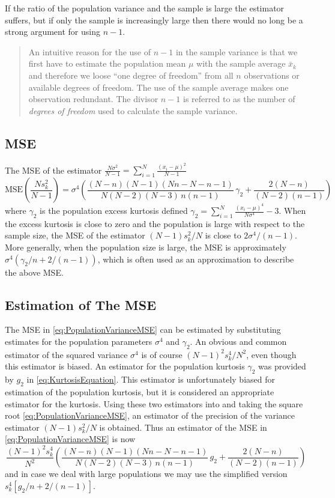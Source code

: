 If the ratio of the population variance and the sample is large the estimator suffers, but if only the sample is increasingly large then there would no long be a strong argument for using $n-1$.
\begin{quote}
    An intuitive reason for the use of $n - 1$ in the sample variance is that we first have to estimate the population mean $\mu$ with the sample average $\bar{x}_k$ and therefore we loose ``one degree of freedom'' from all $n$ 
    observations or available degrees of freedom. The use of the sample average makes one observation redundant.  The divisor $n - 1$ is referred to as the number of \textit{degrees of freedom} used to calculate the sample variance.
\end{quote}

\subsection{MSE}
The MSE of the estimator $\frac{N\sigma^2}{N-1}=\sum_{i=1}^{N}\frac{(x_i-\mu)^2}{N-1}$
\begin{equation}\label{eq:PopulationVarianceMSE}
    \text{MSE}\!\left(\frac{N s_k^2}{N - 1}\right) = \sigma^4 \left(\frac{(N - n)(N - 1)(Nn - N - n - 1)}{N(N - 2)(N - 3)\,n(n - 1)}\,\gamma_2 + \frac{2(N - n)}{(N - 2)(n - 1)}\right) 
\end{equation}
where $\gamma_2$ is the population excess kurtosis defined $\gamma_2=\sum_{i=1}^{N}\frac{(x_i-\mu)^4}{N\sigma^4}-3$. When the excess kurtosis is close to zero and the population is large with respect to the sample size, the MSE of the estimator 
$(N - 1)s_k^2 / N$ is close to $2\sigma^4 / (n - 1)$. More generally, when the population size is large, the MSE is approximately $\sigma^4(\gamma_2 / n + 2/(n - 1))$, which is often used as an approximation to describe the above MSE. 

\subsection{Estimation of The MSE}
The MSE in \cref{eq:PopulationVarianceMSE} can be estimated by substituting estimates for the population parameters $\sigma^4$ and $\gamma_2$. An obvious and common estimator of the squared variance $\sigma^4$ is of course $(N - 1)^2 s_k^4 / N^2$, even though
this estimator is biased. An estimator for the population kurtosis $\gamma_2$ was provided by $g_2$ in \cref{eq:KurtosisEquation}. This estimator is unfortunately biased for estimation of the population kurtosis, but it is considered an appropriate
estimator for the kurtosis. Using these two estimators into and taking the square root \cref{eq:PopulationVarianceMSE}, an estimator of the precision of the variance estimator $(N - 1)s_k^2 / N$ is obtained. Thus an estimator of the MSE in 
\cref{eq:PopulationVarianceMSE} is now
\begin{equation}
    \frac{(N - 1)^2 s_k^4}{N^2}
    \left(
        \frac{(N - n)(N - 1)(Nn - N - n - 1)}{N(N - 2)(N - 3)\,n(n - 1)}\,g_2 + \frac{2(N - n)}{(N - 2)(n - 1)}
    \right)
\end{equation}
and in case we deal with large populations we may use the simplified version
$s_k^4[g_2/n + 2/(n - 1)]$.